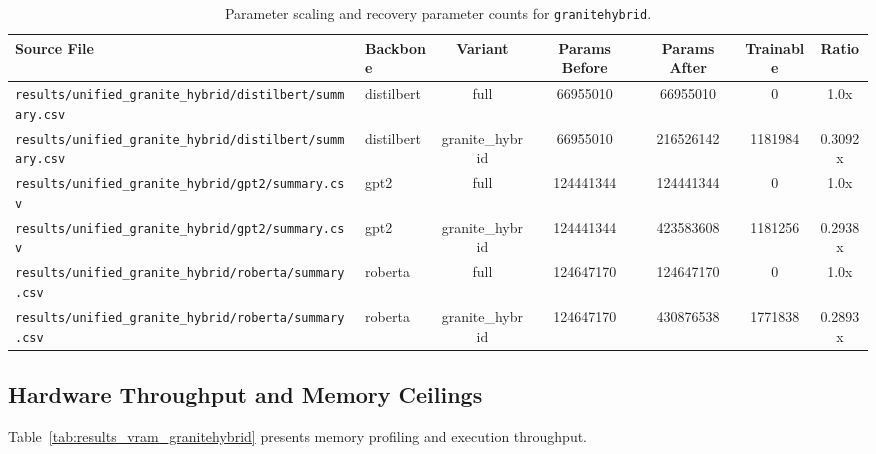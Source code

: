 \begin{table}[t]
\centering
\small
\begin{tabular}{llccccc}
\toprule
\textbf{Source File} & \textbf{Backbone} & \textbf{Variant} & \textbf{Params Before} & \textbf{Params After} & \textbf{Trainable} & \textbf{Ratio} \\
\midrule
\texttt{results/unified\_granite\_hybrid/distilbert/summary.csv} & distilbert & full & 66955010 & 66955010 & 0 & 1.0x \\
\texttt{results/unified\_granite\_hybrid/distilbert/summary.csv} & distilbert & granite\_hybrid & 66955010 & 216526142 & 1181984 & 0.3092x \\
\texttt{results/unified\_granite\_hybrid/gpt2/summary.csv} & gpt2 & full & 124441344 & 124441344 & 0 & 1.0x \\
\texttt{results/unified\_granite\_hybrid/gpt2/summary.csv} & gpt2 & granite\_hybrid & 124441344 & 423583608 & 1181256 & 0.2938x \\
\texttt{results/unified\_granite\_hybrid/roberta/summary.csv} & roberta & full & 124647170 & 124647170 & 0 & 1.0x \\
\texttt{results/unified\_granite\_hybrid/roberta/summary.csv} & roberta & granite\_hybrid & 124647170 & 430876538 & 1771838 & 0.2893x \\
\bottomrule
\end{tabular}
\caption{Parameter scaling and recovery parameter counts for \texttt{granitehybrid}.}
\label{tab:results_params_granitehybrid}
\end{table}

\subsection{Hardware Throughput and Memory Ceilings}
Table~\ref{tab:results_vram_granitehybrid} presents memory profiling and execution throughput.

